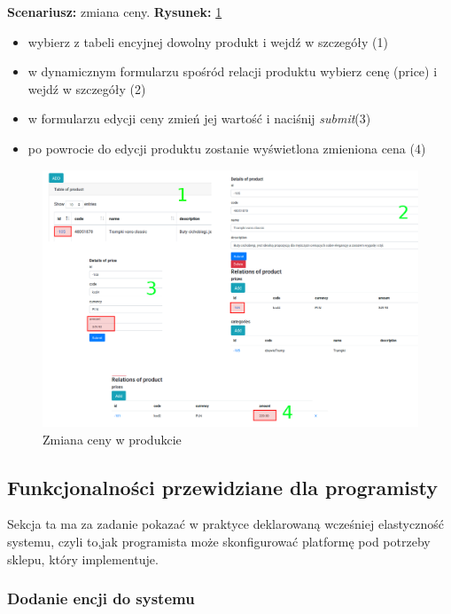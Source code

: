 \noindent
\textbf{Scenariusz: } zmiana ceny. \textbf{Rysunek: } \ref{zmianacenyproduktu} 
\begin{itemize}
	\item wybierz z tabeli encyjnej dowolny produkt i wejdź w szczegóły (1)
	\item w dynamicznym formularzu spośród relacji produktu wybierz cenę (price) i wejdź w szczegóły (2) 
	\item w formularzu edycji ceny zmień jej wartość i naciśnij \textit{submit}(3)
	\item po powrocie do edycji produktu zostanie wyświetlona zmieniona cena (4)
\end{itemize}
\begin{figure}
	\begin{center}
		\includegraphics[scale=1.3]{zmianacenyproduktu.png}
	\end{center}
	\caption{{\color{black}Zmiana ceny w produkcie}} \label{zmianacenyproduktu}
\end{figure}


\subsection{Funkcjonalności przewidziane dla programisty}
Sekcja ta ma za zadanie pokazać w praktyce deklarowaną wcześniej elastyczność systemu, czyli to,jak programista może skonfigurować platformę pod potrzeby sklepu, który implementuje. 
\subsubsection{Dodanie encji do systemu}









